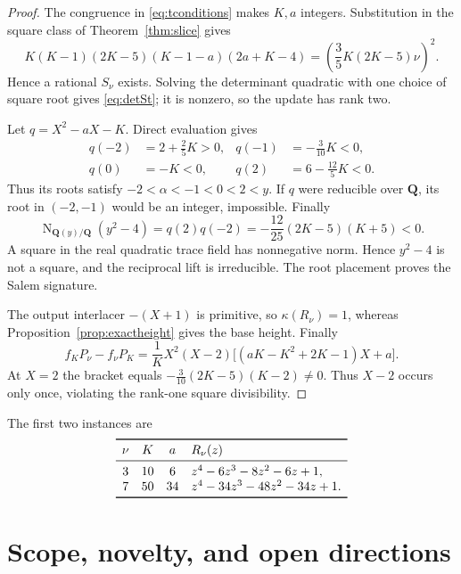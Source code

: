 \documentclass[11pt,reqno]{amsart}
\theoremstyle{definition}
\theoremstyle{remark}
\DeclareMathOperator{\N}{N}
\newcommand{\Q}{\mathbf Q}
\begin{document}
\begin{proof}
The congruence in \eqref{eq:tconditions} makes $K,a$ integers.  Substitution
in the square class of Theorem~\ref{thm:slice} gives
\[
 K(K-1)(2K-5)(K-1-a)(2a+K-4)
 =\left(\frac35K(2K-5)\nu\right)^2.
\]
Hence a rational $S_\nu$ exists.  Solving the determinant quadratic with one
choice of square root gives \eqref{eq:detSt}; it is nonzero, so the update has
rank two.

Let $q=X^2-aX-K$.  Direct evaluation gives
\begin{align}\label{eq:qsigns}
 q(-2)&=2+\frac25K>0,&q(-1)&=-\frac3{10}K<0,\\
 q(0)&=-K<0,&q(2)&=6-\frac{12}{5}K<0.
\end{align}
Thus its roots satisfy
$-2<\alpha<-1<0<2<y$.  If $q$ were reducible over $\Q$, its root in
$(-2,-1)$ would be an integer, impossible.  Finally
\begin{equation}\label{eq:normsquare}
 \N_{\Q(y)/\Q}(y^2-4)=q(2)q(-2)
 =-\frac{12}{25}(2K-5)(K+5)<0.
\end{equation}
A square in the real quadratic trace field has nonnegative norm.  Hence
$y^2-4$ is not a square, and the reciprocal lift is irreducible.  The root
placement proves the Salem signature.

The output interlacer $-(X+1)$ is primitive, so $\kappa(R_\nu)=1$, whereas
Proposition~\ref{prop:exactheight} gives the base height.  Finally
\begin{equation}\label{eq:crossinfinite}
 f_KP_\nu-f_\nu P_K=
 \frac1KX^2(X-2)
 \bigl[(aK-K^2+2K-1)X+a\bigr].
\end{equation}
At $X=2$ the bracket equals
$-\frac3{10}(2K-5)(K-2)\ne0$.  Thus $X-2$ occurs only once, violating the
rank-one square divisibility.
\end{proof}

The first two instances are
\[
\begin{array}{c@{\quad}c@{\quad}c@{\quad}l}
\toprule
\nu&K&a&R_\nu(z)\\
\midrule
3&10&6&z^4-6z^3-8z^2-6z+1,\\
7&50&34&z^4-34z^3-48z^2-34z+1.\\
\bottomrule
\end{array}
\]

\section{Scope, novelty, and open directions}
\end{document}
